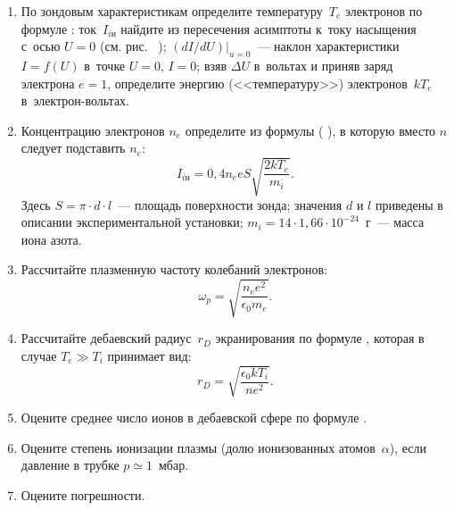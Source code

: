 \begin{lab:task}
\begin{enumerate}
\item По зондовым характеристикам определите температуру~$T_e$ электронов по формуле %
: ток~$I_{iн}$ %
найдите
из пересечения асимптоты к~току насыщения с~осью $U=0$ (см. рис.~%
); $(dI/dU)|_{u=0}$~--- наклон
характеристики $I=f(U)$ в~точке $U=0$, $I=0$; взяв $\Delta U$ в~вольтах и приняв заряд электрона $e=1$, определите
энергию (<<температуру>>) электронов~$kT_e$ в~электрон-вольтах.

\item Концентрацию электронов $n_e$ определите из формулы (%
), в которую вместо $n$ следует подставить $n_e$:
\begin{equation}
I_{iн}=0,4n_e eS\sqrt{\frac{2kT_e}{m_i}}.
\end{equation}
Здесь $S=\pi\cdot d\cdot l$~--- площадь поверхности зонда; значения $d$ и $l$ приведены в описании экспериментальной
установки; $m_i=14\cdot 1,66\cdot 10^{-24}$~г~--- масса иона азота.

\item Рассчитайте плазменную частоту колебаний электронов:
\begin{equation}
\omega_p=\sqrt{\frac{n_e e^2}{\epsilon_0 m_e}}.
\end{equation}

\item Рассчитайте дебаевский радиус~$r_{D}$ экранирования по формуле%
, которая в случае $T_{e} \gg T_{i}$ принимает вид:
\begin{equation}
r_{D}=\sqrt{\frac{\epsilon_{0}kT_{i}}{n e^{2}}}.
\end{equation}

\item Оцените среднее число ионов в дебаевской сфере по формуле %
.

\item Оцените степень ионизации плазмы (долю ионизованных атомов~$\alpha$), если давление в трубке $p \simeq1$~мбар.

\item Оцените погрешности.

\end{enumerate}

\end{lab:task}